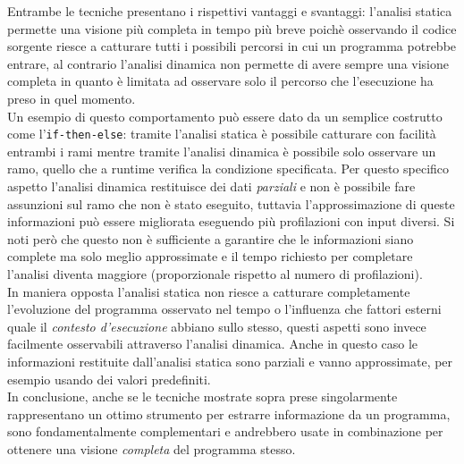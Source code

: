 Entrambe le tecniche presentano i rispettivi vantaggi e svantaggi: l'analisi statica permette una visione più completa in tempo più breve poichè osservando il codice sorgente riesce a catturare tutti i possibili percorsi in cui un programma potrebbe entrare, al contrario l'analisi dinamica non permette di avere sempre una visione completa in quanto è limitata ad osservare solo il percorso che l'esecuzione ha preso in quel momento.\\
Un esempio di questo comportamento può essere dato da un semplice costrutto come l'\texttt{if-then-else}: tramite l'analisi statica è possibile catturare con facilità entrambi i rami mentre tramite l'analisi dinamica è possibile solo osservare un ramo, quello che a runtime verifica la condizione specificata. Per questo specifico aspetto l'analisi dinamica restituisce dei dati \emph{parziali} e non è possibile fare assunzioni sul ramo che non è stato eseguito, tuttavia l'approssimazione di queste informazioni può essere migliorata eseguendo più profilazioni con input diversi. Si noti però che questo non è sufficiente a garantire che le informazioni siano complete ma solo meglio approssimate e il tempo richiesto per completare l'analisi diventa maggiore (proporzionale rispetto al numero di profilazioni).\\
In maniera opposta l'analisi statica non riesce a catturare completamente l'evoluzione del programma osservato nel tempo o l'influenza che fattori esterni quale il \emph{contesto d'esecuzione} abbiano sullo stesso, questi aspetti sono invece facilmente osservabili attraverso l'analisi dinamica. Anche in questo caso le informazioni restituite dall'analisi statica sono parziali e vanno approssimate, per esempio usando dei valori predefiniti.\bigskip \\
In conclusione, anche se le tecniche mostrate sopra prese singolarmente rappresentano un ottimo strumento per estrarre informazione da un programma, sono fondamentalmente complementari e andrebbero usate in combinazione per ottenere una visione \emph{completa} del programma stesso.



